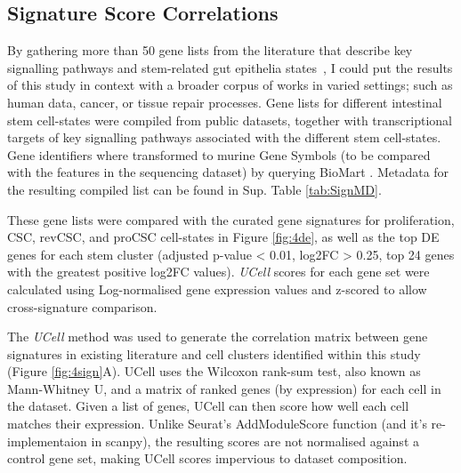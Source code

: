\subsection{Signature Score Correlations}

By gathering more than 50 gene lists from the literature that describe key signalling pathways and stem-related gut epithelia states~\cite{ayyaz_single-cell_2019, vasquez_molecular_2022, alvarez-varela_mex3a_2022, mustata_identification_2013,  yui_yaptaz-dependent_2018, munoz_lgr5_2012, li_reference_2017, han_lineage_2020, merlos-suarez_intestinal_2011, dalerba_single-cell_2011, pelka_spatially_2021, gregorieff_yap-dependent_2015, canellas-socias_metastatic_2022, wang_comprehensive_2018, mourao_lineage_2019, barriga_mex3a_2017, bues_deterministic_2022, morral_zonation_2020}, I could put the results of this study in context with a broader corpus of works in varied settings; such as human data, cancer, or tissue repair processes.
Gene lists for different intestinal stem cell-states were compiled from public datasets, together with transcriptional targets of key signalling pathways associated with the different stem cell-states. Gene identifiers where transformed to murine Gene Symbols (to be compared with the features in the sequencing dataset) by querying BioMart \cite{smedley_biomart_2009}. Metadata for the resulting compiled list can be found in Sup. Table \ref{tab:SignMD}.

These gene lists were compared with the curated gene signatures for proliferation, CSC, revCSC, and proCSC cell-states in Figure \ref{fig:4de}, as well as the top DE genes for each stem cluster (adjusted p-value < 0.01, log2FC > 0.25, top 24 genes with the greatest positive log2FC values). \textit{UCell} scores for each gene set were calculated using Log-normalised gene expression values and z-scored to allow cross-signature comparison.

The \textit{UCell} \cite{andreatta_ucell_2021} method was used to generate the correlation matrix between gene signatures in existing literature and cell clusters identified within this study (Figure \ref{fig:4sign}A). UCell uses the Wilcoxon rank-sum test, also known as Mann-Whitney U, and a matrix of ranked genes (by expression) for each cell in the dataset. Given a list of genes, UCell can then score how well each cell matches their expression. Unlike Seurat's AddModuleScore function (and it's re-implementaion in scanpy), the resulting scores are not normalised against a control gene set, making UCell scores impervious to dataset composition. 


